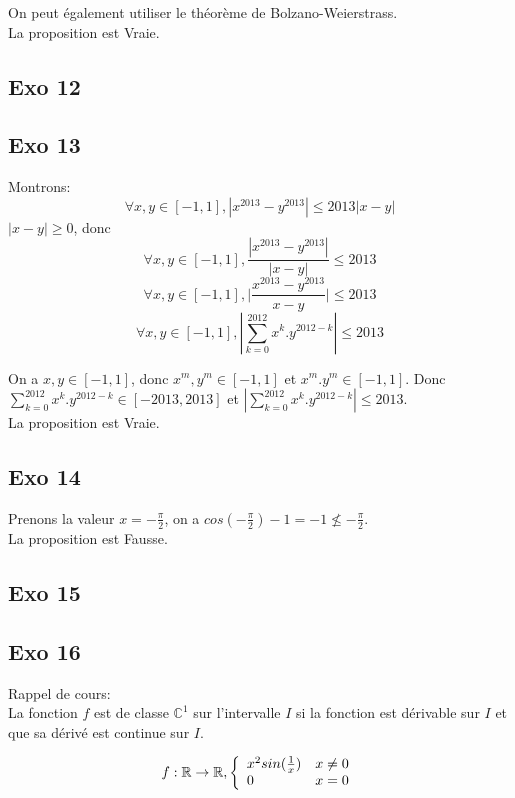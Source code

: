 \documentclass[]{book}
\theoremstyle{definition}
\newcommand{\bb}[1]{\mathbb{#1}}
\newcommand{\R}{\bb{R}}
\newcommand{\C}{\bb{C}}
\begin{document}
On peut \'egalement utiliser le th\'eor\`eme de Bolzano-Weierstrass.\\

La proposition est Vraie.

\subsection*{Exo 12}

\subsection*{Exo 13}
Montrons:
$$\forall x,y \in [-1,1],|x^{2013} - y^{2013}| \le 2013|x-y|$$
$|x-y| \ge 0$, donc
$$\forall x,y \in [-1,1],\frac{|x^{2013} - y^{2013}|}{|x-y|} \le 2013$$
$$\forall x,y \in [-1,1],\Big| \frac{x^{2013} - y^{2013}}{x-y} \Big| \le 2013$$
$$\forall x,y \in [-1,1], |\sum_{k=0}^{2012}x^k.y^{2012-k}| \le 2013$$

On a $x,y \in [-1,1]$, donc $x^m,y^m \in [-1,1]$ et $x^m.y^m \in [-1,1]$. Donc $\sum_{k=0}^{2012}x^k.y^{2012-k} \in [-2013,2013]$ et $|\sum_{k=0}^{2012}x^k.y^{2012-k}| \le 2013$.
\\

La proposition est Vraie.


\subsection*{Exo 14}
Prenons la valeur $x = -\frac{\pi}{2}$, on a $cos(-\frac{\pi}{2})-1 = -1 \nleq -\frac{\pi}{2}$.\\


La proposition est Fausse.


\subsection*{Exo 15}

\subsection*{Exo 16}
Rappel de cours:\\
La fonction $f$ est de classe $\C^1$ sur l'intervalle $I$ si la fonction est d\'erivable sur $I$ et que sa d\'eriv\'e est continue sur $I$.

$$f: \R \to \R,
\left\{ 
\begin{array}{l l}
 x^2sin(\frac{1}{x}) & x \neq 0\\
 0 & x = 0\\
\end{array}
\right. 
$$
\end{document}
